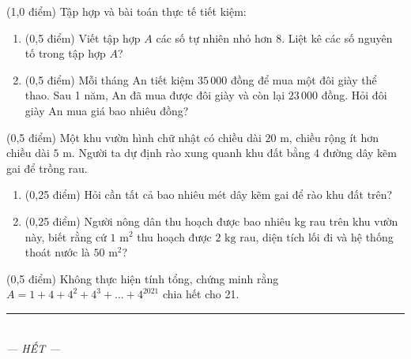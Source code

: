 \documentclass[12pt,a4paper]{article}
\begin{document}
\begin{ex} (1,0 điểm)
Tập hợp và bài toán thực tế tiết kiệm:
\begin{enumerate}[label=\textbf{\alph*)}, leftmargin=0.8cm, itemsep=2pt]
\item (0,5 điểm) Viết tập hợp $A$ các số tự nhiên nhỏ hơn 8. Liệt kê các số nguyên tố trong tập hợp $A$?
\item (0,5 điểm) Mỗi tháng An tiết kiệm $35\,000$ đồng để mua một đôi giày thể thao. Sau 1 năm, An đã mua được đôi giày và còn lại $23\,000$ đồng. Hỏi đôi giày An mua giá bao nhiêu đồng?
\end{enumerate}
\end{ex}
\vspace{1.5mm}

\begin{ex} (0,5 điểm)
Một khu vườn hình chữ nhật có chiều dài $20\text{ m}$, chiều rộng ít hơn chiều dài $5\text{ m}$. Người ta dự định rào xung quanh khu đất bằng 4 đường dây kẽm gai để trồng rau.
\begin{enumerate}[label=\textbf{\alph*)}, leftmargin=0.8cm, itemsep=2pt]
\item (0,25 điểm) Hỏi cần tất cả bao nhiêu mét dây kẽm gai để rào khu đất trên?
\item (0,25 điểm) Người nông dân thu hoạch được bao nhiêu kg rau trên khu vườn này, biết rằng cứ $1\text{ m}^2$ thu hoạch được $2\text{ kg}$ rau, diện tích lối đi và hệ thống thoát nước là $50\text{ m}^2$?
\end{enumerate}
\end{ex}
\vspace{1.5mm}

\begin{ex} (0,5 điểm)
Không thực hiện tính tổng, chứng minh rằng $A = 1 + 4 + 4^2 + 4^3 + \dots + 4^{2021}$ chia hết cho 21.
\end{ex}
\vspace{1.5mm}


\begin{center}
\rule{4cm}{0.4pt}\\
\textit{--- HẾT ---}
\end{center}
\end{document}

